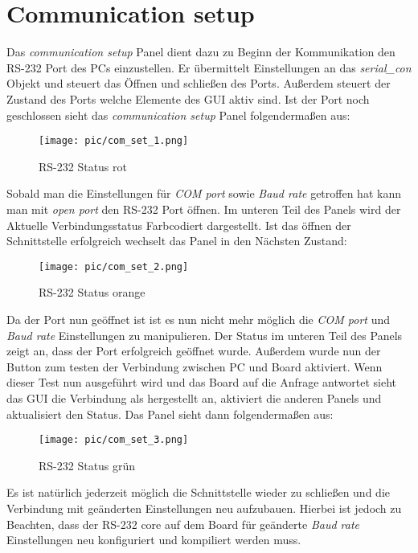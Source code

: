 \documentclass[%
  paper=A4, %
  pagesize, %
  12pt,
  ngerman   %
]{scrreprt}  %
\begin{document}
\section{Communication setup}
\label{sec:com_set}
Das \emph{communication setup} Panel dient dazu zu Beginn der Kommunikation den RS-232 Port des PCs einzustellen. Er übermittelt Einstellungen an das \emph{serial\_con} Objekt und steuert das Öffnen und schließen des Ports. Außerdem steuert der Zustand des Ports welche Elemente des GUI aktiv sind. Ist der Port noch geschlossen sieht das \emph{communication setup} Panel folgendermaßen aus:

\begin{figure}[ht]
	\centering
  \texttt{[image: pic/com\_set\_1.png]}
	\caption{RS-232 Status rot}
	\label{ser_red}
\end{figure}

Sobald man die Einstellungen für \emph{COM port} sowie \emph{Baud rate} getroffen hat kann man mit \emph{open port} den RS-232 Port öffnen. Im unteren Teil des Panels wird der Aktuelle Verbindungsstatus Farbcodiert dargestellt. Ist das öffnen der Schnittstelle erfolgreich wechselt das Panel in den Nächsten Zustand:

\begin{figure}[ht]
	\centering
  \texttt{[image: pic/com\_set\_2.png]}
	\caption{RS-232 Status orange}
	\label{ser_orange}
\end{figure}

Da der Port nun geöffnet ist ist es nun nicht mehr möglich die \emph{COM port} und \emph{Baud rate} Einstellungen zu manipulieren. Der Status im unteren Teil des Panels zeigt an, dass der Port erfolgreich geöffnet wurde. Außerdem wurde nun der Button zum testen der Verbindung zwischen PC und Board aktiviert. Wenn dieser Test nun ausgeführt wird und das Board auf die Anfrage antwortet sieht das GUI die Verbindung als hergestellt an, aktiviert die anderen Panels und aktualisiert den Status. Das Panel sieht dann folgendermaßen aus:

\begin{figure}[ht]
	\centering
  \texttt{[image: pic/com\_set\_3.png]}
	\caption{RS-232 Status grün}
	\label{ser_green}
\end{figure}



Es ist natürlich jederzeit möglich die Schnittstelle wieder zu schließen und die Verbindung mit geänderten Einstellungen neu aufzubauen. Hierbei ist jedoch zu Beachten, dass der RS-232 core auf dem Board für geänderte \emph{Baud rate} Einstellungen neu konfiguriert und kompiliert werden muss.
\end{document}
